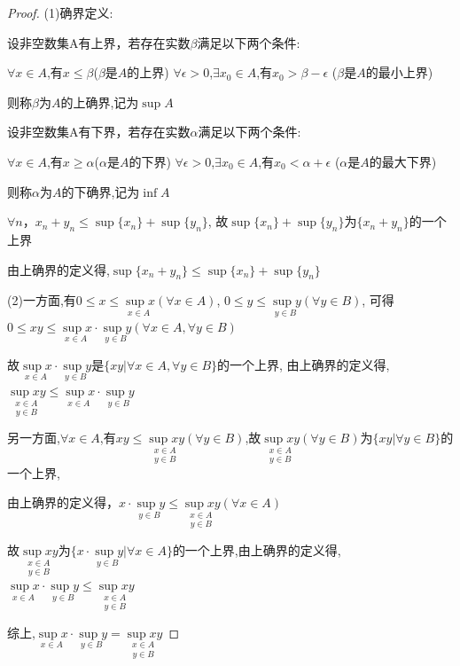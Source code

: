 \begin{proof}
    (1)确界定义:
    
    设非空数集A有上界，若存在实数$\beta$满足以下两个条件:

    $\forall x\in A$,有$x\le \beta$\quad($\beta$是$A$的上界)
    \qquad
    $\forall \epsilon>0$,$\exists x_0 \in A$,有$x_0>\beta - \epsilon$ \quad ($\beta$是$A$的最小上界)

    则称$\beta$为$A$的上确界,记为$\sup A$
    \vspace{3pt}

    设非空数集A有下界，若存在实数$\alpha$满足以下两个条件:

    $\forall x\in A$,有$x\ge \alpha$\quad($\alpha$是$A$的下界)
    \qquad
    $\forall \epsilon>0$,$\exists x_0 \in A$,有$x_0<\alpha + \epsilon$ \quad ($\alpha$是$A$的最大下界)

    则称$\alpha$为$A$的下确界,记为$\inf A$

    \vspace{3pt}
    $\forall n$，$x_n+y_n\le \sup\{x_n\}+\sup\{y_n\}$,
    故$\sup\{x_n\}+\sup\{y_n\}$为$\{x_n+y_n\}$的一个上界

    由上确界的定义得,$\sup\{x_n+y_n\}\le \sup\{x_n\}+\sup\{y_n\}$

    \vspace{3pt}
    (2)一方面,有$0\le x \le \underset{x\in A}{\sup x}(\forall x\in A)$,
    $0 \le y \le \underset{y\in B}{\sup y}(\forall y\in B)$,
    可得$0\le xy \le \underset{x\in A}{\sup x}\cdot \underset{y\in B}{\sup y} (\forall x\in A,\forall y\in B)$

    故$\underset{x\in A}{\sup x}\cdot \underset{y\in B}{\sup y} $是$\{xy|\forall x\in A,\forall y\in B\}$的一个上界,
    由上确界的定义得,$\underset{y \in B}{\underset{x \in A}{\sup xy}}\le \underset{x\in A}{\sup x}\cdot \underset{y\in B}{\sup y}$

    另一方面,$\forall x\in A$,有$xy \le \underset{y \in B}{\underset{x \in A}{\sup xy}}(\forall y \in B)$,故$\underset{y \in B}{\underset{x \in A}{\sup xy}}(\forall y \in B)$为$\{xy|\forall y \in B\}$的一个上界,

    由上确界的定义得，$x \cdot \underset{y\in B}{\sup y} \le \underset{y \in B}{\underset{x \in A}{\sup xy}}(\forall x\in A)$

    故$\underset{y \in B}{\underset{x \in A}{\sup xy}}$为$\{x \cdot \underset{y\in B}{\sup y}|\forall x\in A\}$的一个上界,由上确界的定义得,$\underset{x\in A}{\sup x} \cdot \underset{y \in B}{\sup y} \le \underset{y \in B}{\underset{x \in A}{\sup xy}}$

    综上,$\underset{x\in A}{\sup x} \cdot \underset{y \in B}{\sup y} = \underset{y \in B}{\underset{x \in A}{\sup xy}}$
\end{proof}

